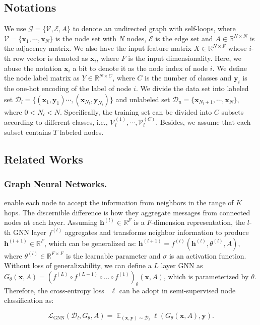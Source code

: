\documentclass[letterpaper]{article} %
\newcommand{\labeledset}{\mathcal{D}_{l}}
\newcommand{\unlabeledset}{\mathcal{D}_{u}}
\newcommand{\aVec}[1]{\mathbf{#1}}
\DeclareMathOperator*{\expectation}{\mathbb{E}}
\begin{document}
\subsection{Notations}
We use $\mathcal{G}=\{\mathcal{V}, \mathcal{E}, A\}$ to denote an undirected graph with self-loops, where $\mathcal{V}=\{\aVec{x}_{1}, \cdots, \aVec{x}_{N}\}$ is the node set with $N$ nodes, $\mathcal{E}$ is the edge set and $A \in \mathbb{R}^{N \times N}$ is the adjacency matrix. We also have the input feature matrix $X \in \mathbb{R}^{N \times F}$ whose $i$-th row vector is denoted as $\aVec{x}_{i}$, where $F$ is the input dimensionality. Here, we abuse the notation $\aVec{x}_{i}$ a bit to denote it as the node index of node $i$. We define the node label matrix as $Y \in \mathbb{R}^{N \times C}$, where $C$ is the number of classes and $\aVec{y}_{i}$ is the one-hot encoding of the label of node $i$. We divide the data set into labeled set $\labeledset=\{(\aVec{x}_{1},\aVec{y}_{1}) \cdots, (\aVec{x}_{N_{l}}, \aVec{y}_{N_{l}})\}$ and unlabeled set $\unlabeledset=\{\aVec{x}_{N_{l}+1}, \cdots, \aVec{x}_{N}\}$, where $0 < N_{l} < N$. Specifically, the training set can be divided into $C$ subsets according to different classes, i.e., $\mathcal{V}_{l}^{(1)}, \cdots, \mathcal{V}_{l}^{(C)}$. Besides, we assume that each subset contains $T$ labeled nodes.

\subsection{Related Works}
\subsubsection{Graph Neural Networks.}
\cite{sage,gcn,gat,gin,sgc,gcnii,appnp,gprgnn} enable each node to accept the information from neighbors in the range of $K$ hops. The discernible difference is how they aggregate messages from connected nodes at each layer. Assuming $\aVec{h}^{(l)} \in \mathbb{R}^{F}$ is a $F$-dimension representation, the $l$-th GNN layer $f^{(l)}$ aggregates and transforms neighbor information to produce $\aVec{h}^{(l+1)} \in \mathbb{R}^{F}$, which can be generalized as:
$
	\aVec{h}^{(l+1)} = f^{(l)}(\aVec{h}^{(l)}, \theta^{(l)}, A),
$
where $\theta^{(l)} \in \mathbb{R}^{F \times F} $ is the learnable parameter and $\sigma$ is an activation function. Without loss of generalizability, we can define a $L$ layer GNN as $G_{\theta}(\aVec{x}, A) = (f^{(L)} \circ f^{(L-1)} \circ \dots \circ f^{(1)})_{\theta} (\aVec{x}, A)$, which is parameterized by $\theta$. Therefore, the cross-entropy loss~\cite{cross_entropy} $\ell$ can be adopt in semi-supervised node classification as: 
\begin{small}
	\begin{equation}
	\label{loss-gnn}
		\mathcal{L}_{\text{GNN}} (\labeledset, G_{\theta}, A) = \expectation_{(\aVec{x}, \aVec{y}) \sim \labeledset} \ell(G_{\theta}(\aVec{x}, A), \aVec{y}).
	\end{equation} 
\end{small}
\end{document}
